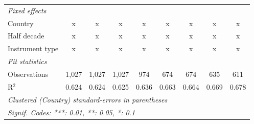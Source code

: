 \begin{tabular}{lcccccccc}
   \emph{Fixed effects}\\
   Country                                                      & x             & x             & x             & x             & x              & x              & x              & x\\  
   Half decade                                                  & x             & x             & x             & x             & x              & x              & x              & x\\  
   Instrument type                                              & x             & x             & x             & x             & x              & x              & x              & x\\  
   \midrule \emph{Fit statistics}\\
   Observations                                                 & 1,027         & 1,027         & 1,027         & 974           & 674            & 674            & 635            & 611\\  
   R$^2$                                                        & 0.624         & 0.624         & 0.625         & 0.636         & 0.663          & 0.664          & 0.669          & 0.678\\  
   \midrule
   \multicolumn{9}{l}{\emph{Clustered (Country) standard-errors in parentheses}}\\
   \multicolumn{9}{l}{\emph{Signif. Codes: ***: 0.01, **: 0.05, *: 0.1}}\\
\end{tabular}
\par\endgroup


